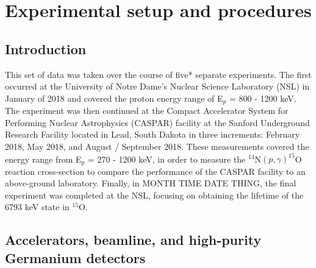 %
%
%
%
%
%
%
%
%
%

%
%

\chapter{Experimental setup and procedures}
\label{chap: experiment}

\section{Introduction}

This set of data was taken over the course of five* separate experiments. The first occurred at the University of Notre Dame's Nuclear Science Laboratory (NSL) in January of 2018 and covered the proton energy range of E$_{p}$ = 800 - 1200 keV. The experiment was then continued at the Compact Accelerator System for Performing Nuclear Astrophysics (CASPAR) facility at the Sanford Underground Research Facility located in Lead, South Dakota in three increments: February 2018, May 2018, and August / September 2018. These measurements covered the energy range from E$_{p}$ = 270 - 1200 keV, in order to measure the $^{14}$N$\left( p,\gamma \right) ^{15}$O reaction cross-section to compare the performance of the CASPAR facility to an above-ground laboratory. Finally, in MONTH TIME DATE THING, the final experiment was completed at the NSL, focusing on obtaining the lifetime of the 6793 keV state in $^{15}$O.

\section{Accelerators, beamline, and high-purity Germanium detectors}
\label{sec: accelerators, beamline, and detectors}



